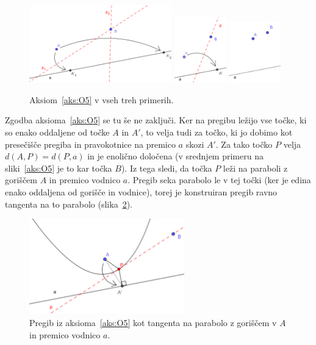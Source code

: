 \begin{figure}[h!]
    \centering
    \includegraphics[width=0.55\textwidth]{images/origami_aksiomi/O5a.png}
    \includegraphics[width=0.2\textwidth]{images/origami_aksiomi/O5b.png}
    \includegraphics[width=0.2\textwidth]{images/origami_aksiomi/O5c.png}
    \caption[Aksiom~\ref{aks:O5}]{Aksiom~\ref{aks:O5} v vseh treh primerih.}
    \label{fig:O5}
\end{figure}

Zgodba aksioma~\ref{aks:O5} se tu še ne zaključi. Ker na pregibu ležijo vse točke, ki so enako oddaljene od točke $A$ in $A'$, to velja tudi za točko, ki jo dobimo kot presečišče pregiba in pravokotnice na premico $a$ skozi $A'$. Za tako točko $P$ velja $ d(A,P) = d(P,a) $ in je enolično določena (v srednjem primeru na sliki~\ref{aks:O5} je to kar točka $B$). Iz tega sledi, da točka $P$ leži na paraboli z goriščem $A$ in premico vodnico $a$. Pregib seka parabolo le v tej točki (ker je edina enako oddaljena od gorišče in vodnice), torej je konstruiran pregib ravno tangenta na to parabolo (slika~\ref{fig:O5_parabola}).

\begin{figure}[h!]
    \centering
    \includegraphics[width=0.6\textwidth]{images/origami_aksiomi/O5_parabola.png}
    \caption[Tangenta na parabolo]{Pregib iz aksioma~\ref{aks:O5} kot tangenta na parabolo z goriščem v $A$ in premico vodnico $a$.}
    \label{fig:O5_parabola}
\end{figure}


